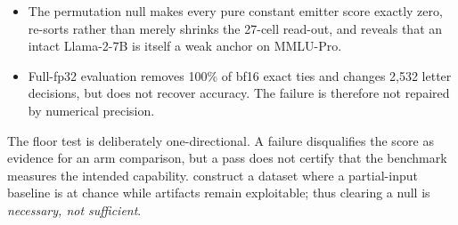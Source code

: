 \begin{itemize}[leftmargin=*,nosep]
    \item The permutation null makes every pure constant emitter score exactly zero, re-sorts rather than merely shrinks the 27-cell read-out, and reveals that an intact Llama-2-7B is itself a weak anchor on MMLU-Pro.
    \item Full-fp32 evaluation removes 100\% of bf16 exact ties and changes 2,532 letter decisions, but does not recover accuracy. The failure is therefore not repaired by numerical precision.
\end{itemize}

The floor test is deliberately one-directional. A failure disqualifies the score as evidence for an arm comparison, but a pass does not certify that the benchmark measures the intended capability. \citet{feng2019misleading} construct a dataset where a partial-input baseline is at chance while artifacts remain exploitable; thus clearing a null is \emph{necessary, not sufficient}.
